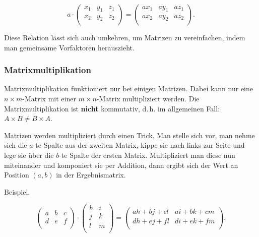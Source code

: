 \documentclass{scrartcl}
\begin{document}
\begin{equation}
	a \cdot \begin{pmatrix*}
		x_1 & y_1 & z_1\\
		x_2 & y_2 & z_2\\
	\end{pmatrix*} = \begin{pmatrix*}
		ax_1 & ay_1 & az_1\\
		ax_2 & ay_2 & az_2\\
	\end{pmatrix*}.
\end{equation}

Diese Relation lässt sich auch umkehren, um Matrizen zu vereinfachen, indem man gemeinsame Vorfaktoren herauszieht.

\subsubsection{Matrixmultiplikation}

Matrixmultiplikation funktioniert nur bei einigen Matrizen. Dabei kann nur eine $n\times m$-Matrix mit einer
$m\times n$-Matrix multipliziert werden. Die Matrixmultiplikation ist \textbf{nicht} kommutativ, d.\,h. im
allgemeinen Fall: $A \times B \not= B\times A$.

Matrizen werden multipliziert durch einen \frq Trick\flq. Man stelle sich vor, man nehme sich die $a$-te Spalte aus
der zweiten Matrix, kippe sie nach links zur Seite und lege sie über die $b$-te Spalte der ersten Matrix.
Multipliziert man diese nun miteinander und komponiert sie per Addition, dann ergibt sich der Wert an Position $(a, b)$
in der Ergebnismatrix.

Beispiel.

\begin{equation}
	\begin{pmatrix*}
		a & b & c\\
		d & e & f\\
	\end{pmatrix*} \cdot \begin{pmatrix*}
		h & i\\
		j & k\\
		l & m\\
	\end{pmatrix*} = \begin{pmatrix*}
		ah+bj+cl & ai+bk+cm\\
		dh+ej+fl & di+ek+fm\\
	\end{pmatrix*}.
\end{equation}
\end{document}
